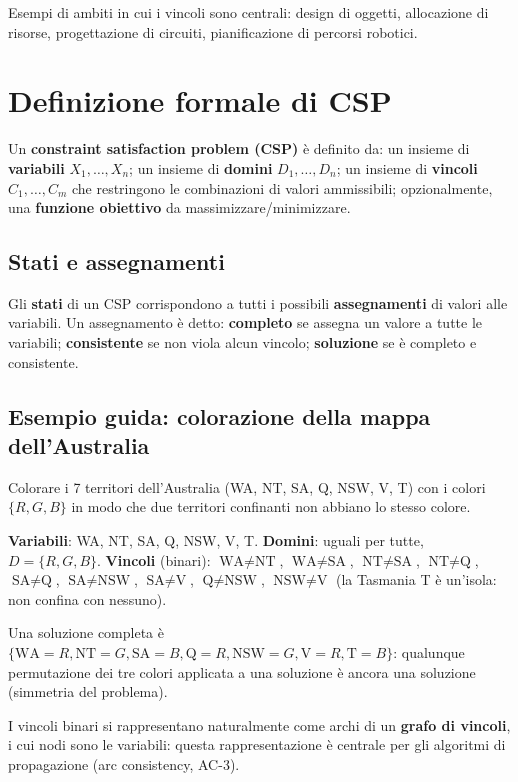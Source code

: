 \documentclass[11pt,a4paper]{report}
\begin{document}
Esempi di ambiti in cui i vincoli sono centrali: design di oggetti, allocazione di risorse, progettazione di circuiti, pianificazione di percorsi robotici.

\section{Definizione formale di CSP}

Un \textbf{constraint satisfaction problem (CSP)} è definito da: un insieme di \textbf{variabili} $X_1,\dots,X_n$; un insieme di \textbf{domini} $D_1,\dots,D_n$; un insieme di \textbf{vincoli} $C_1,\dots,C_m$ che restringono le combinazioni di valori ammissibili; opzionalmente, una \textbf{funzione obiettivo} da massimizzare/minimizzare.

\subsection*{Stati e assegnamenti}

Gli \textbf{stati} di un CSP corrispondono a tutti i possibili \textbf{assegnamenti} di valori alle variabili. Un assegnamento è detto: \textbf{completo} se assegna un valore a tutte le variabili; \textbf{consistente} se non viola alcun vincolo; \textbf{soluzione} se è completo e consistente.

\subsection*{Esempio guida: colorazione della mappa dell'Australia}

Colorare i 7 territori dell'Australia (WA, NT, SA, Q, NSW, V, T) con i colori $\{R,G,B\}$ in modo che due territori confinanti non abbiano lo stesso colore.

\textbf{Variabili}: WA, NT, SA, Q, NSW, V, T. \textbf{Domini}: uguali per tutte, $D=\{R,G,B\}$. \textbf{Vincoli} (binari): $\text{WA}\ne\text{NT}$, $\text{WA}\ne\text{SA}$, $\text{NT}\ne\text{SA}$, $\text{NT}\ne\text{Q}$, $\text{SA}\ne\text{Q}$, $\text{SA}\ne\text{NSW}$, $\text{SA}\ne\text{V}$, $\text{Q}\ne\text{NSW}$, $\text{NSW}\ne\text{V}$ (la Tasmania T è un'isola: non confina con nessuno).

Una soluzione completa è $\{\text{WA}{=}R,\text{NT}{=}G,\text{SA}{=}B,\text{Q}{=}R,\text{NSW}{=}G,\text{V}{=}R,\text{T}{=}B\}$: qualunque permutazione dei tre colori applicata a una soluzione è ancora una soluzione (simmetria del problema).

I vincoli binari si rappresentano naturalmente come archi di un \textbf{grafo di vincoli}, i cui nodi sono le variabili: questa rappresentazione è centrale per gli algoritmi di propagazione (arc consistency, AC-3).
\end{document}
